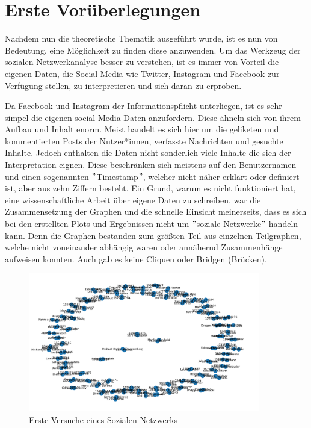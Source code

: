 \chapter{Erste Vorüberlegungen}\label{ch:examples}
Nachdem nun die theoretische Thematik ausgeführt wurde, ist es nun von Bedeutung, eine Möglichkeit zu finden diese anzuwenden. 
Um das Werkzeug der sozialen Netzwerkanalyse besser zu verstehen, ist es immer von Vorteil die eigenen Daten, die Social Media wie Twitter, Instagram und Facebook zur Verfügung stellen, zu interpretieren und sich daran zu erproben. 

Da Facebook und Instagram der Informationspflicht unterliegen, ist es sehr simpel die eigenen social Media Daten anzufordern. Diese ähneln sich von ihrem Aufbau und Inhalt enorm. Meist handelt es sich hier um die geliketen und kommentierten Posts der Nutzer*innen, verfasste Nachrichten und gesuchte Inhalte. Jedoch enthalten die Daten nicht sonderlich viele Inhalte die sich der Interpretation eignen. Diese beschränken sich meistens auf den Benutzernamen und einen sogenannten $"$Timestamp$"$, welcher nicht näher erklärt oder definiert ist, aber aus zehn Ziffern besteht.
Ein Grund, warum es nicht funktioniert hat, eine wissenschaftliche Arbeit über eigene Daten zu schreiben, war die Zusammensetzung der Graphen und die schnelle Einsicht meinerseits, dass es sich bei den erstellten Plots und Ergebnissen nicht um $"$soziale Netzwerke$"$ handeln kann.
Denn die Graphen bestanden zum größten Teil aus einzelnen Teilgraphen, welche nicht voneinander abhängig waren oder annähernd Zusammenhänge aufweisen konnten. Auch gab es keine Cliquen oder Bridgen (Brücken). \\
\FloatBarrier
\begin{figure}[h!]
    \centering
    \includegraphics[width=0.9\textwidth]{Graphics/PlotOwnData.png}
    \caption{Erste Versuche eines Sozialen Netzwerks}
    \label{fig:OwnData}
\end{figure}
\FloatBarrier

